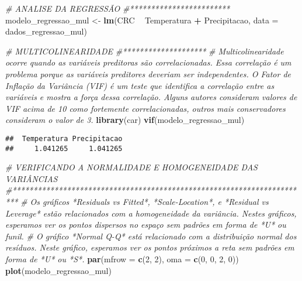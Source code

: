 \documentclass[
]{book}
\newenvironment{Shaded}{\begin{snugshade}}{\end{snugshade}}
\newcommand{\CommentTok}[1]{\textcolor[rgb]{0.56,0.35,0.01}{\textit{#1}}}
\newcommand{\DataTypeTok}[1]{\textcolor[rgb]{0.13,0.29,0.53}{#1}}
\newcommand{\DecValTok}[1]{\textcolor[rgb]{0.00,0.00,0.81}{#1}}
\newcommand{\KeywordTok}[1]{\textcolor[rgb]{0.13,0.29,0.53}{\textbf{#1}}}
\newcommand{\NormalTok}[1]{#1}
\newcommand{\OperatorTok}[1]{\textcolor[rgb]{0.81,0.36,0.00}{\textbf{#1}}}
\newcommand{\StringTok}[1]{\textcolor[rgb]{0.31,0.60,0.02}{#1}}
\begin{document}
\begin{Shaded}
\begin{Highlighting}[]
\CommentTok{# ANALISE DA REGRESSÃO}
\CommentTok{#************************}
\NormalTok{modelo_regressao_mul <-}\StringTok{ }\KeywordTok{lm}\NormalTok{(CRC }\OperatorTok{~}\StringTok{ }\NormalTok{Temperatura }\OperatorTok{+}\StringTok{ }\NormalTok{Precipitacao, }\DataTypeTok{data =}\NormalTok{ dados_regressao_mul)}

\CommentTok{# MULTICOLINEARIDADE}
\CommentTok{#********************}
\CommentTok{# Multicolinearidade ocorre quando as variáveis preditoras são correlacionadas. Essa correlação é um problema porque as variáveis preditores deveriam ser independentes. O Fator de Inflação da Variância (VIF) é um teste que identifica a correlação entre as variáveis e mostra a força dessa correlação. Alguns autores consideram valores de VIF acima de 10 como fortemente correlacionadas, outros mais conservadores consideram o valor de 3.}
\KeywordTok{library}\NormalTok{(car)}
\KeywordTok{vif}\NormalTok{(modelo_regressao_mul)}
\end{Highlighting}
\end{Shaded}

\begin{verbatim}
##  Temperatura Precipitacao 
##     1.041265     1.041265
\end{verbatim}

\begin{Shaded}
\begin{Highlighting}[]
\CommentTok{# VERIFICANDO A NORMALIDADE E HOMOGENEIDADE DAS VARIÂNCIAS}
\CommentTok{#***********************************************************************}
\CommentTok{# Os gráficos *Residuals vs Fitted*, *Scale-Location*, e *Residual vs Leverage* estão relacionados com a homogeneidade da variância. Nestes gráficos, esperamos ver os pontos dispersos no espaço sem padrões em forma de *U* ou funil. }
\CommentTok{# O gráfico *Normal Q-Q* está relacionado com a distribuição normal dos resíduos. Neste gráfico, esperamos ver os pontos próximos a reta sem padrões em forma de *U* ou *S*. }
\KeywordTok{par}\NormalTok{(}\DataTypeTok{mfrow =} \KeywordTok{c}\NormalTok{(}\DecValTok{2}\NormalTok{, }\DecValTok{2}\NormalTok{), }\DataTypeTok{oma =} \KeywordTok{c}\NormalTok{(}\DecValTok{0}\NormalTok{, }\DecValTok{0}\NormalTok{, }\DecValTok{2}\NormalTok{, }\DecValTok{0}\NormalTok{))}
\KeywordTok{plot}\NormalTok{(modelo_regressao_mul)}
\end{Highlighting}
\end{Shaded}
\end{document}
